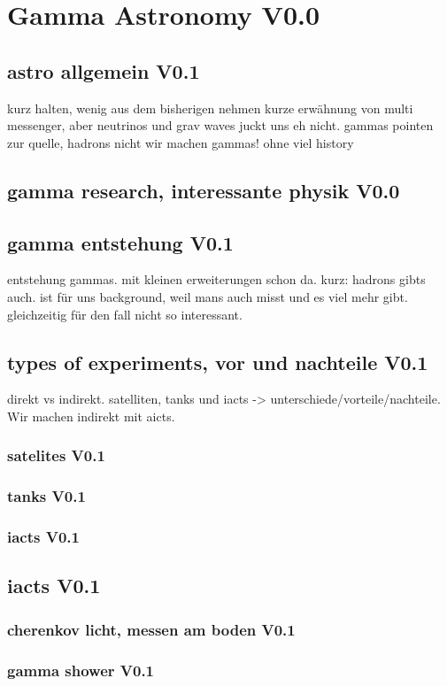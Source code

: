 \chapter{Gamma Astronomy V0.0}
\section{astro allgemein V0.1}
kurz halten, wenig aus dem bisherigen nehmen
kurze erwähnung von multi messenger, aber neutrinos und 
grav waves juckt uns eh nicht.
gammas pointen zur quelle, hadrons nicht
wir machen gammas!
ohne viel history
\section{gamma research, interessante physik V0.0}
\section{gamma entstehung V0.1}
entstehung gammas. mit kleinen erweiterungen schon da.
kurz: hadrons gibts auch. ist für uns background, weil mans auch misst
und es viel mehr gibt. gleichzeitig für den fall nicht so interessant.
\section{types of experiments, vor und nachteile V0.1}
direkt vs indirekt.
satelliten, tanks und iacts -> unterschiede/vorteile/nachteile.
Wir machen indirekt mit aicts.
\subsection{satelites V0.1}
\subsection{tanks V0.1}
\subsection{iacts V0.1}
\section{iacts V0.1}
\subsection{cherenkov licht, messen am boden V0.1}
\subsection{gamma shower V0.1}
